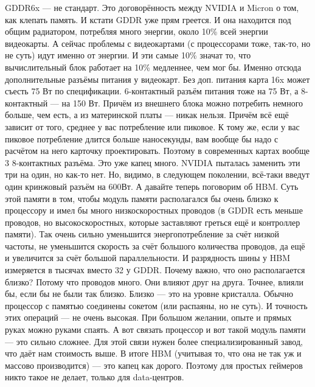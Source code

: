\documentclass{article}
\begin{document}
GDDR6x --- не стандарт. Это договорённость между NVIDIA и Micron о том, как клепать память. И кстати GDDR уже прям греется. И она находится под общим радиатором, потребляя много энергии, около 10\% всей энергии видеокарты. А сейчас проблемы с видеокартами (с процессорами тоже, так-то, но не суть) идут именно от энергии. И эти самые 10\% значат то, что вычислительный блок работает на 10\% медленнее, чем мог бы. Именно отсюда дополнительные разъёмы питания у видеокарт. Без доп. питания карта 16x может съесть 75 Вт по спецификации. 6-контактный разъём питания тоже на 75 Вт, а 8-контактный --- на 150 Вт. Причём из внешнего блока можно потребить немного больше, чем есть, а из материнской платы --- никак нельзя. Причём всё ещё зависит от того, среднее у вас потребление или пиковое. К тому же, если у вас пиковое потребление длится больше наносекунды, вам вообще бы надо с расчётом на него карточку проектировать. Поэтому в современных картах вообще 3 8-контактных разъёма. Это уже капец много. NVIDIA пыталась заменить эти три на один, но как-то нет. Но, видимо, в следующем поколении, всё-таки введут один кринжовый разъём на 600Вт. А давайте теперь поговорим об HBM. Суть этой памяти в том, чтобы модуль памяти располагался бы очень близко к процессору и имел бы много низкоскоростных проводов (в GDDR есть меньше проводов, но высокоскоростных, которые заставляют греться ещё и контроллер памяти). Так очень сильно уменьшится энергопотребление за счёт низкой частоты, не уменьшится скорость за счёт большого количества проводов, да ещё и увеличится за счёт большой параллельности. И разрядность шины у HBM измеряется в тысячах вместо 32 у GDDR. Почему важно, что оно располагается близко? Потому что проводов много. Они влияют друг на друга. Точнее, влияли бы, если бы не были так близко. Близко --- это на уровне кристалла. Обычно процессор с памятью соединены сокетом (или распаяны, но не суть). И точность этих операций --- не очень высокая. При большом желании, опыте и прямых руках можно руками спаять. А вот связать процессор и вот такой модуль памяти --- это сильно сложнее. Для этой связи нужен более специализированный завод, что даёт нам стоимость выше. В итоге HBM (учитывая то, что она не так уж и массово производится) --- это капец как дорого. Поэтому для простых геймеров никто такое не делает, только для data-центров.\\
\end{document}
